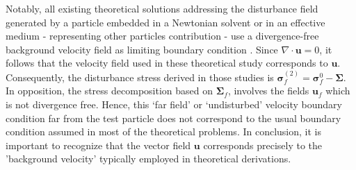 Notably, all existing theoretical solutions addressing the disturbance field generated by a particle embedded in a Newtonian solvent or in an effective medium - representing other particles contribution - use a divergence-free background velocity field as limiting boundary condition \citep{kim1985modelling, hinch1977averaged}. 
Since $\nabla \cdot \textbf{u} = 0$, it follows that the velocity field used in these theoretical study corresponds to $\textbf{u}$. 
Consequently, the disturbance stress derived in those studies is $\bm\sigma_f^{(2)} = \bm\sigma_f^0 - \bm\Sigma$.
In opposition, the stress decomposition based on $\bm\Sigma_f$, involves the fields $\textbf{u}_f$ which is not divergence free. 
Hence, this `far field' or `undisturbed' velocity boundary condition far from the test particle does not correspond to the usual boundary condition assumed in most of the theoretical problems. 
In conclusion, it is important to recognize that the vector field \(\textbf{u}\) corresponds precisely to the 'background velocity' typically employed in theoretical derivations. 
